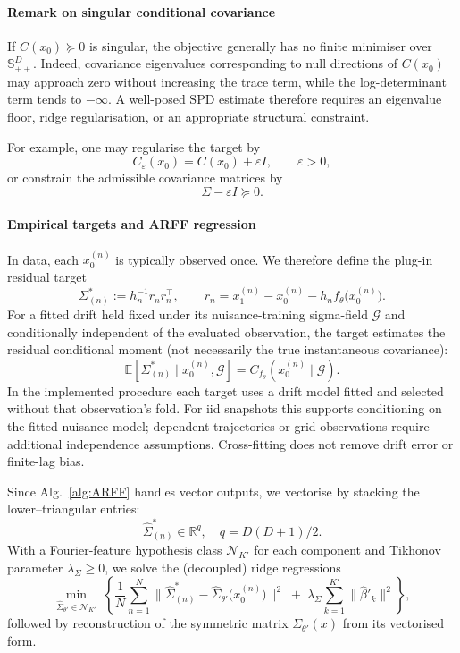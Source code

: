 \documentclass{article}
\newcommand{\E}{\mathbb{E}}
\def\R{\mathbb{R}}
\def\E{\mathbb{E}}
\begin{document}
{\color{black}\paragraph{Remark on singular conditional covariance}
If $C(x_0)\succeq0$ is singular, the objective generally has no
finite minimiser over $\mathbb S_{++}^D$. Indeed, covariance
eigenvalues corresponding to null directions of $C(x_0)$ may approach
zero without increasing the trace term, while the log-determinant term
tends to $-\infty$. A well-posed SPD estimate therefore requires an
eigenvalue floor, ridge regularisation, or an appropriate structural
constraint.

For example, one may regularise the target by
\[
C_\varepsilon(x_0)=C(x_0)+\varepsilon I,
\qquad \varepsilon>0,
\]
or constrain the admissible covariance matrices by
\[
\Sigma-\varepsilon I\succeq0.
\]}


{\color{black} \paragraph{Empirical targets and ARFF regression}
In data, each $x_0^{(n)}$ is typically observed once. We therefore
define the plug-in residual target
\[
\Sigma^{*}_{(n)}
:=
h_n^{-1}r_nr_n^\top,
\qquad
r_n
=
x_1^{(n)}-x_0^{(n)}
-h_nf_\theta\!\bigl(x_0^{(n)}\bigr).
\]
For a fitted drift held fixed under its nuisance-training sigma-field $\mathcal G$ and conditionally independent of the evaluated observation, the target estimates the residual conditional moment (not necessarily the true instantaneous covariance):
\[
\E\!\left[\Sigma^{*}_{(n)}\mid x_0^{(n)},\mathcal G\right]
=
C_{f_\theta}(x_0^{(n)}\mid\mathcal G).
\]
In the implemented procedure each target uses a drift model fitted and selected without that observation's fold. For iid snapshots this supports conditioning on the fitted nuisance model; dependent trajectories or grid observations require additional independence assumptions. Cross-fitting does not remove drift error or finite-lag bias.}

Since Alg.~\ref{alg:ARFF} handles vector outputs, we vectorise by stacking the lower--triangular entries:
\[
\widehat{\Sigma}^{*}_{(n)} \in \R^{q}, \quad q = D(D{+}1)/2.
\]
With a Fourier-feature hypothesis class $\mathcal{N}_{K'}$ for each component and Tikhonov parameter $\lambda_\Sigma \ge 0$, we solve the (decoupled) ridge regressions
\[
\min_{\widehat\Sigma_{\theta'} \in \mathcal{N}_{K'}} \;
\left\{\frac{1}{N}\sum_{n=1}^{N} \Big\| \widehat{\Sigma}^{*}_{(n)} - \widehat{\Sigma}_{\theta'}\!\bigl(x^{(n)}_0\bigr) \Big\|^2
\;+\; \lambda_\Sigma \sum_{k=1}^{K'} \|\hat\beta'_k\|^2\right\},
\]
followed by reconstruction of the symmetric matrix $\Sigma_{\theta'}(x)$ from its vectorised form.
\end{document}
